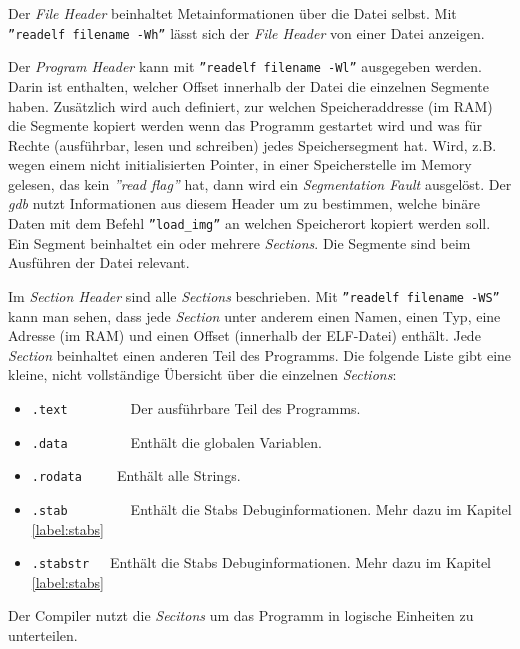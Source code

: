 


Der \textit{File Header} beinhaltet Metainformationen über die Datei selbst.
Mit \texttt{''readelf filename -Wh''} lässt sich der \textit{File Header} von einer Datei anzeigen.

Der \textit{Program Header} kann mit \texttt{''readelf filename -Wl''} ausgegeben werden. Darin ist enthalten, welcher Offset innerhalb der Datei die einzelnen Segmente haben.
Zusätzlich wird auch definiert, zur welchen Speicheraddresse (im RAM) die Segmente kopiert werden wenn das Programm gestartet wird und was für Rechte (ausführbar, lesen und schreiben) jedes Speichersegment hat.
Wird, z.B. wegen einem nicht initialisierten Pointer, in einer Speicherstelle im Memory gelesen, das kein \textit{''read flag''} hat, dann wird ein \textit{Segmentation Fault} ausgelöst.
Der \textit{gdb} nutzt Informationen aus diesem Header um zu bestimmen, welche binäre Daten mit dem Befehl \texttt{''load\_img''} an welchen Speicherort kopiert werden soll.
Ein Segment beinhaltet ein oder mehrere \textit{Sections}.
Die Segmente sind beim Ausführen der Datei relevant.

Im \textit{Section Header} sind alle \textit{Sections} beschrieben.
Mit \texttt{''readelf filename -WS''} kann man sehen, dass jede \textit{Section} unter anderem einen Namen, einen Typ, eine Adresse (im RAM) und einen Offset (innerhalb der ELF-Datei) enthält.
Jede \textit{Section} beinhaltet einen anderen Teil des Programms.
Die folgende Liste gibt eine kleine, nicht vollständige Übersicht über die einzelnen \textit{Sections}:
\begin{itemize}
	\item \texttt{.text}\ \ \ \ \ \ \ \ \ Der ausführbare Teil des Programms.
	\item \texttt{.data}\ \ \ \ \ \ \ \ \ Enthält die globalen Variablen.
	\item \texttt{.rodata}\ \ \ \ \ Enthält alle Strings.
	\item \texttt{.stab}\ \ \ \ \ \ \ \ \ Enthält die Stabs Debuginformationen. Mehr dazu im Kapitel \ref{label:stabs} 
	\item \texttt{.stabstr}\ \ \ Enthält die Stabs Debuginformationen. Mehr dazu im Kapitel \ref{label:stabs} 
\end{itemize}
Der Compiler nutzt die \textit{Secitons} um das Programm in logische Einheiten zu unterteilen.



